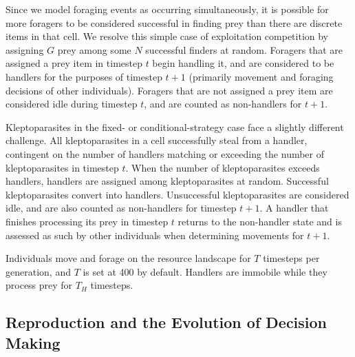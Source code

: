 \documentclass[11pt]{article}
\begin{document}
Since we model foraging events as occurring simultaneously, it is possible for more foragers to be considered successful in finding prey than there are discrete items in that cell.
We resolve this simple case of exploitation competition by assigning $G$ prey among some $N$ successful finders at random.
Foragers that are assigned a prey item in timestep $t$ begin handling it, and are considered to be handlers for the purposes of timestep $t+1$ (primarily movement and foraging decisions of other individuals).
Foragers that are not assigned a prey item are considered idle during timestep $t$, and are counted as non-handlers for $t+1$.

Kleptoparasites in the fixed- or conditional-strategy case face a slightly different challenge.
All kleptoparasites in a cell successfully steal from a handler, contingent on the number of handlers matching or exceeding the number of kleptoparasites in timestep $t$.
When the number of kleptoparasites exceeds handlers, handlers are assigned among kleptoparasites at random.
Successful kleptoparasites convert into handlers.
Unsuccessful kleptoparasites are considered idle, and are also counted as non-handlers for timestep $t+1$.
A handler that finishes processing its prey in timestep $t$ returns to the non-handler state and is assessed as such by other individuals when determining movements for $t+1$.

Individuals move and forage on the resource landscape for $T$ timesteps per generation, and $T$ is set at 400 by default. 
Handlers are immobile while they process prey for $T_H$ timesteps.

\subsection{Reproduction and the Evolution of Decision Making}
\end{document}
